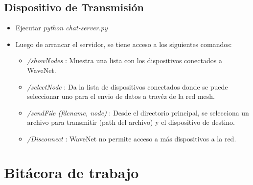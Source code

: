 \documentclass{article}
\begin{document}
\subsection{Dispositivo de Transmisi\'on}
\begin{itemize}
  \item Ejecutar \emph{python chat-server.py}
  \item Luego de arrancar el servidor, se tiene acceso a los siguientes comandos:
  \begin{itemize}
    \item \emph{/showNodes} : Muestra una lista con los dispositivos conectados a WaveNet.
    \item \emph{/selectNode} : Da la lista de dispositivos conectados donde se puede seleccionar uno para el envio de datos a trav\'ez de la red mesh.
    \item \emph{/sendFile (filename, node)} : Desde el directorio principal, se selecciona un archivo para transmitir (path del archivo) y el dispositivo de destino.
    \item \emph{/Disconnect} : WaveNet no permite acceso a m\'as dispositivos a la red.
  \end{itemize}
\end{itemize}
\section{Bit\'acora de trabajo}
\end{document}
